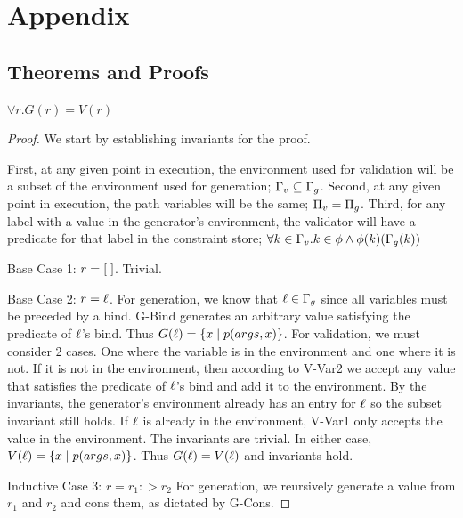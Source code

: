 \section{Appendix}

\subsection{Theorems and Proofs}
\label{sec:appendix-lemmas}

\begin{theorem}
    $\forall r. G(r) = V(r)$
\end{theorem}

\begin{proof}

    \par We start by establishing invariants for the proof.
    \par First, at any given point in execution, the environment used for validation will be a subset of the environment used for generation; $\Gamma_v \subseteq \Gamma_g$.
        Second,  at any given point in execution, the path variables will be the same; $\Pi_v = \Pi_g$. 
        Third, for any label with a value in the generator's environment, the validator will have a predicate for that label in the constraint store; $\forall k \in \Gamma_v. k \in \phi \land \phi(k)(\Gamma_g(k))$
    \par Base Case 1: $r = [\;]$. Trivial.
    \par Base Case 2: $r = \ell$. 
        For generation, we know that $\ell \in \Gamma_g$ since all variables must be preceded by a bind.
        G-Bind generates an arbitrary value satisfying the predicate of $\ell$'s bind.
        Thus $G(\ell) = \{ x\;|\;p(args, x)\}$.
        For validation, we must consider 2 cases.
        One where the variable is in the environment and one where it is not. 
        If it is not in the environment, then according to V-Var2 we accept any value that satisfies the predicate of $\ell$'s bind and add it to the environment. 
        By the invariants, the generator's environment already has an entry for $\ell$ so the subset invariant still holds.
        If $\ell$ is already in the environment, V-Var1 only accepts the value in the environment. The invariants are trivial.
        In either case, $V(\ell) = \{ x\;|\;p(args, x)\}$.
        Thus $G(\ell) = V(\ell)$ and invariants hold.
    \par Inductive Case 3: $r = r_1 :> r_2$
        For generation, we reursively generate a value from $r_1$ and $r_2$ and cons them, as dictated by G-Cons.

\end{proof}
